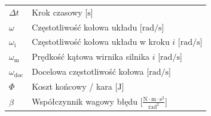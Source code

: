 \begin{tabular}{ll}
    $\Delta t$                  & Krok czasowy [$\text{s}$] \\
    $\omega$                    & Częstotliwość kołowa układu [$\text{rad/s}$] \\
    $\omega_{\text{i}}$         & Częstotliwość kołowa układu w kroku $i$ [$\text{rad/s}$] \\
    $\omega_{\text{m}}$         & Prędkość kątowa wirnika silnika $i$ [$\text{rad/s}$] \\
    $\omega_{{\text{doc}}}$     & Docelowa częstotliwość kołowa [$\text{rad/s}$] \\
    $\Phi$                      & Koszt końcowy / kara [$\text{J}$] \\
    $\beta$                     & Współczynnik wagowy błędu [$\frac{\text{N}\cdot\text{m}\cdot\text{s}^2}{\text{rad}^2}$] \\
\end{tabular}